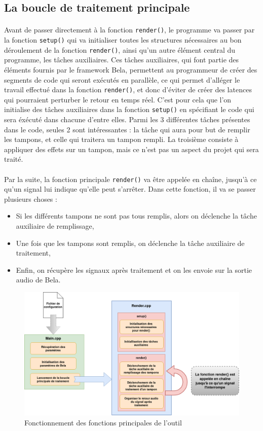 \subsection{La boucle de traitement principale}
\paragraph{}
Avant de passer directement à la fonction \verb!render()!, le programme va passer par la fonction \verb!setup()! qui va initialiser toutes les structures nécessaires au bon déroulement de la fonction \verb!render()!, ainsi qu'un autre élément central du programme, les tâches auxiliaires. Ces tâches auxiliaires, qui font partie des éléments fournis par le framework Bela, permettent au programmeur de créer des segments de code qui seront exécutés en parallèle, ce qui permet d'alléger le travail effectué dans la fonction \verb!render()!, et donc d'éviter de créer des latences qui pourraient perturber le retour en temps réel. C'est pour cela que l'on initialise des tâches auxiliaires dans la fonction \verb!setup()! en spécifiant le code qui sera éxécuté dans chacune d'entre elles. Parmi les 3 différentes tâches présentes dans le code, seules 2 sont intéressantes : la tâche qui aura pour but de remplir les tampons, et celle qui traitera un tampon rempli. La troisième consiste à appliquer des effets sur un tampon, mais ce n'est pas un aspect du projet qui sera traité.
\paragraph{}
Par la suite, la fonction principale \verb!render()! va être appelée en chaîne, jusqu'à ce qu'un signal lui indique qu'elle peut s'arrêter. Dans cette fonction, il va se passer plusieurs choses : 
\begin{itemize}
    \item Si les différents tampons ne sont pas tous remplis, alors on déclenche la tâche auxiliaire de remplissage,
    \item Une fois que les tampons sont remplis, on déclenche la tâche auxiliaire de traitement,
    \item Enfin, on récupère les signaux après traitement et on les envoie sur la sortie audio de Bela.
\end{itemize}
\begin{figure}[H]
    \centering
    \includegraphics[scale=0.4]{assets/render.png}
    \caption{Fonctionnement des fonctions principales de l'outil}
    \label{focntionnement main render}
\end{figure}

